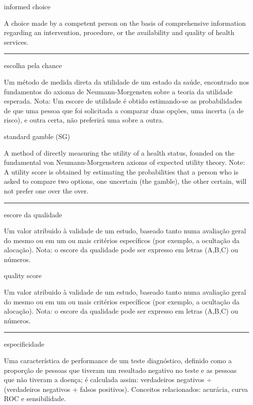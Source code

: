 \documentclass[
]{book}
\begin{document}
informed choice

A choice made by a competent person on the basis of comprehensive information regarding an intervention, procedure, or the availability and quality of health services.

\begin{center}\rule{0.5\linewidth}{0.5pt}\end{center}

escolha pela chance

Um método de medida direta da utilidade de um estado da saúde, encontrado nos fundamentos do axioma de Neumann-Morgensten sobre a teoria da utilidade esperada. Nota: Um escore de utilidade é obtido estimando-se as probabilidades de que uma pessoa que foi solicitada a comparar duas opções, uma incerta (a de risco), e outra certa, não preferirá uma sobre a outra.

standard gamble (SG)

A method of directly measuring the utility of a health status, founded on the fundamental von Neumann-Morgenstern axioms of expected utility theory. Note: A utility score is obtained by estimating the probabilities that a person who is asked to compare two options, one uncertain (the gamble), the other certain, will not prefer one over the over.

\begin{center}\rule{0.5\linewidth}{0.5pt}\end{center}

escore da qualidade

Um valor atribuido à validade de um estudo, baseado tanto numa avaliação geral do mesmo ou em um ou mais critérios específicos (por exemplo, a ocultação da alocação). Nota: o escore da qualidade pode ser expresso em letras (A,B,C) ou números.

quality score

Um valor atribuido à validade de um estudo, baseado tanto numa avaliação geral do mesmo ou em um ou mais critérios específicos (por exemplo, a ocultação da alocação). Nota: o escore da qualidade pode ser expresso em letras (A,B,C) ou números.

\begin{center}\rule{0.5\linewidth}{0.5pt}\end{center}

especificidade

Uma característica de performance de um teste diagnóstico, definido como a proporção de pessoas que tiveram um resultado negativo no teste e as pessoas que não tiveram a doença; é calculada assim: verdadeiros negativos ÷ (verdadeiros negativos + falsos positivos). Conceitos relacionados: acurácia, curva ROC e sensibilidade.
\end{document}

